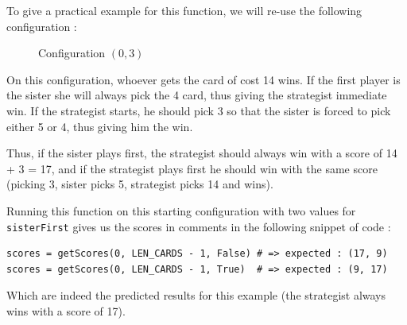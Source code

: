 \documentclass[a4paper,12pt,fleqn]{article}
\newcommand\ezskip{\medskip\noindent}
\begin{document}
\ezskip
To give a practical example for this function, we will re-use the following configuration :

\begin{figure}[H]
    \centering
    \caption{Configuration $(0,3)$}
    \label{fig:recursive_05}
\end{figure}

On this configuration, whoever gets the card of cost 14 wins.
If the first player is the sister she will always pick the 4 card, thus giving the strategist immediate win. If the strategist starts, he should pick 3 so that the sister is forced to pick either 5 or 4, thus giving him the win.

\ezskip
Thus, if the sister plays first, the strategist should always win with a score of 14 + 3 = 17, and if the strategist plays first he should win with the same score (picking 3, sister picks 5, strategist picks 14 and wins).

\ezskip
Running this function on this starting configuration with two values for \texttt{sisterFirst} gives us the scores in comments in the following snippet of code :

\begin{verbatim}
scores = getScores(0, LEN_CARDS - 1, False) # => expected : (17, 9)
scores = getScores(0, LEN_CARDS - 1, True)  # => expected : (9, 17)
\end{verbatim}

Which are indeed the predicted results for this example (the strategist always wins with a score of 17).
\end{document}
